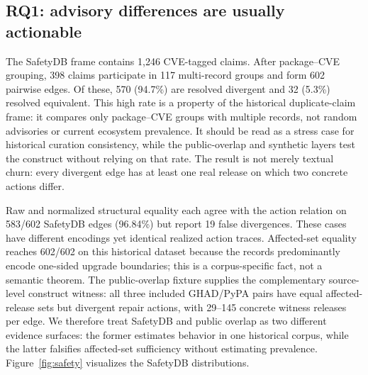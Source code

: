\documentclass[10pt,conference]{IEEEtran}
\begin{document}
\subsection{RQ1: advisory differences are usually actionable}
The SafetyDB frame contains 1,246 CVE-tagged claims. After package--CVE grouping, 398 claims participate in 117 multi-record groups and form 602 pairwise edges. Of these, 570 (94.7\%) are resolved divergent and 32 (5.3\%) resolved equivalent. This high rate is a property of the historical duplicate-claim frame: it compares only package--CVE groups with multiple records, not random advisories or current ecosystem prevalence. It should be read as a stress case for historical curation consistency, while the public-overlap and synthetic layers test the construct without relying on that rate. The result is not merely textual churn: every divergent edge has at least one real release on which two concrete actions differ.

Raw and normalized structural equality each agree with the action relation on 583/602 SafetyDB edges (96.84\%) but report 19 false divergences. These cases have different encodings yet identical realized action traces. Affected-set equality reaches 602/602 on this historical dataset because the records predominantly encode one-sided upgrade boundaries; this is a corpus-specific fact, not a semantic theorem. The public-overlap fixture supplies the complementary source-level construct witness: all three included GHAD/PyPA pairs have equal affected-release sets but divergent repair actions, with 29--145 concrete witness releases per edge. We therefore treat SafetyDB and public overlap as two different evidence surfaces: the former estimates behavior in one historical corpus, while the latter falsifies affected-set sufficiency without estimating prevalence. Figure~\ref{fig:safety} visualizes the SafetyDB distributions.
\end{document}
